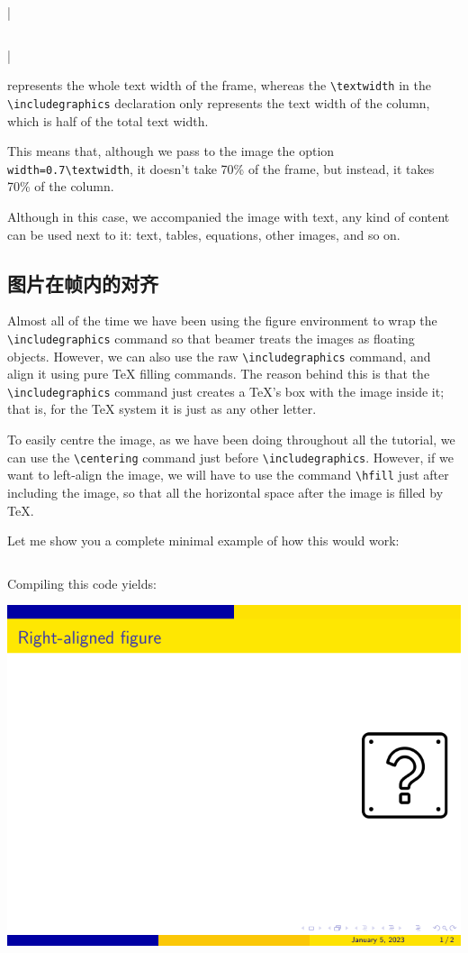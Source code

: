 |\begin{column}{0.5\textwidth}|

represents the whole text width of the frame, whereas the \verb|\textwidth| in the \verb|\includegraphics| declaration only represents the text width of the column, which is half of the total text width.

This means that, although we pass to the image the option \verb|width=0.7\textwidth|, it doesn’t take 70\% of the frame, but instead, it takes 70\% of the column.

Although in this case, we accompanied the image with text, any kind of content can be used next to it: text, tables, equations, other images, and so on.

\subsection{图片在帧内的对齐}

Almost all of the time we have been using the figure environment to wrap the \verb|\includegraphics| command so that beamer treats the images as floating objects. However, we can also use the raw \verb|\includegraphics| command, and align it using pure TeX filling commands. The reason behind this is that the \verb|\includegraphics| command just creates a {\TeX}’s box with the image inside it; that is, for the TeX system it is just as any other letter.

To easily centre the image, as we have been doing throughout all the tutorial, we can use the \verb|\centering| command just before \verb|\includegraphics|. However, if we want to left-align the image, we will have to use the command \verb|\hfill| just after including the image, so that all the horizontal space after the image is filled by {\TeX}.

Let me show you a complete minimal example of how this would work:

\inputminted[linenos=true]{latex}{examples/beamer/figure-alignment-inside-frame.tex}

Compiling this code yields:

\includegraphics[page=1]{examples/beamer/figure-alignment-inside-frame.pdf}


\end{column}
